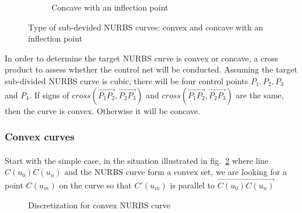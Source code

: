 \begin{figure}
\begin{subfigure}[b]{0.5\linewidth}
{            }
            \caption{Concave with an inflection point}
        \end{subfigure}
    \caption{Type of sub-devided NURBS curves: convex and concave with an inflection point}
    \label{qt_fig:iges_chord_ratio_nurbs}
    \end{figure}

In order to determine the target NURBS curve is convex or concave, a cross product to assess whether the control net will be conducted.
Assuming the target sub-divided NURBS curve is cubic, there will be four control points $P_1,P_2,P_3$ and $P_4$.
If signs of $cross(\overrightarrow{P_1P_2},\overrightarrow{P_2P_3})$ and $cross(\overrightarrow{P_1P_2},\overrightarrow{P_2P_3})$ are the same, then the curve is convex. Otherwise it will be concave.

\subsubsection{Convex curves}
\label{qt_ssc:convex_curves}
\paragraph{}
Start with the simple case, in the situation illustrated in fig.~\ref{qt_fig:iges_chord_split_convex_sum} where line $C(u_0)C(u_n)$ and the NURBS curve form a convex set, we are looking for a point $C(u_m)$ on the curve so that $C'(u_m)$ is parallel to $\overrightarrow{C(u_0)C(u_n)}$
    \begin{figure}[h!]
        \centering
        \caption{Discretization for convex NURBS curve}
        \label{qt_fig:iges_chord_split_convex_sum}
    \end{figure}

